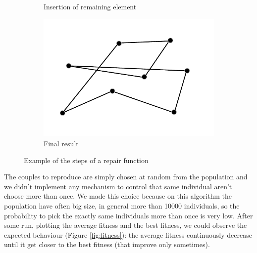 \begin{figure}[h!]
\begin{subfigure}[b]{0.49\linewidth}
    \caption{Insertion of remaining element}
  \end{subfigure}
  \begin{subfigure}[b]{0.49\linewidth}
    \includegraphics[width=\linewidth]{media/gene4.pdf}
    \caption{Final result}
  \end{subfigure}
  \caption{Example of the steps of a repair function}
  \label{fig:genetic}
\end{figure}

\noindent The couples to reproduce are simply chosen at random from the population and we didn't implement any mechanism to control that same individual aren't choose more than once. We made this choice because on this algorithm the population have often big size, in general more than 10000 individuals, so the probability to pick the exactly same individuals more than once is very low.
After some run, plotting the average fitness and the best fitness, we could observe the 
expected behaviour (Figure \ref{fig:fitness}): the average fitness continuously decrease until it get closer to the best fitness (that improve only sometimes).  \\

